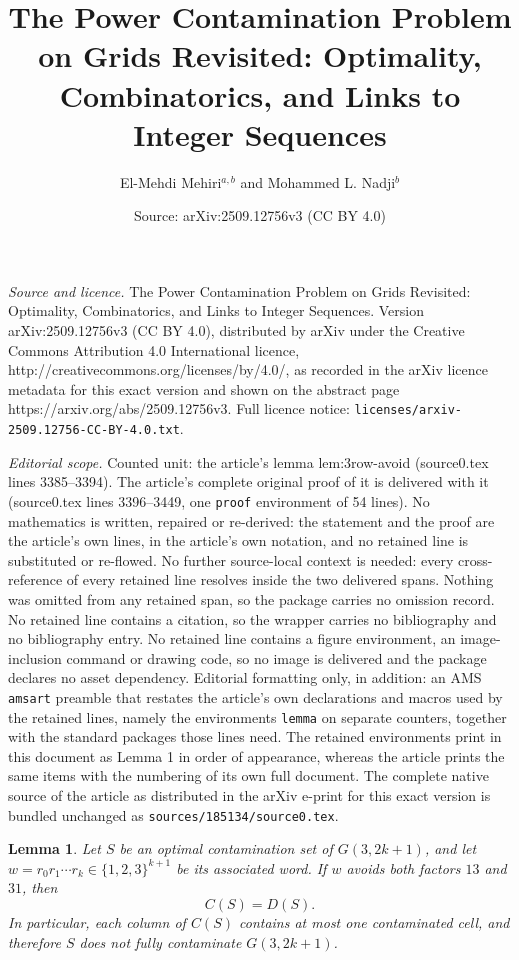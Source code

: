\documentclass[10pt,a4paper]{amsart}
\title{The Power Contamination Problem on Grids Revisited: Optimality, Combinatorics, and Links to Integer Sequences}
\author{El-Mehdi Mehiri$^{a,b}$ and Mohammed L. Nadji$^{b}$}
\date{Source: arXiv:2509.12756v3 (CC BY 4.0)}
\newtheorem{lemma}{Lemma}
\begin{document}
\maketitle

\noindent\emph{Source and licence.} The Power Contamination Problem on Grids Revisited: Optimality, Combinatorics, and Links to Integer Sequences. Version arXiv:2509.12756v3 (CC BY 4.0), distributed by arXiv under the Creative Commons Attribution 4.0 International licence, http://creativecommons.org/licenses/by/4.0/, as recorded in the arXiv licence metadata for this exact version and shown on the abstract page https://arxiv.org/abs/2509.12756v3. Full licence notice: \texttt{licenses/arxiv-2509.12756-CC-BY-4.0.txt}.\par\smallskip

\noindent\textit{Editorial scope.} Counted unit: the article's lemma lem:3row-avoid (source0.tex lines 3385--3394). The article's complete original proof of it is delivered with it (source0.tex lines 3396--3449, one \texttt{proof} environment of 54 lines). No mathematics is written, repaired or re-derived: the statement and the proof are the article's own lines, in the article's own notation, and no retained line is substituted or re-flowed.  No further source-local context is needed: every cross-reference of every retained line resolves inside the two delivered spans.  Nothing was omitted from any retained span, so the package carries no omission record.  No retained line contains a citation, so the wrapper carries no bibliography and no bibliography entry.  No retained line contains a figure environment, an image-inclusion command or drawing code, so no image is delivered and the package declares no asset dependency.  Editorial formatting only, in addition: an AMS \texttt{amsart} preamble that restates the article's own declarations and macros used by the retained lines, namely the environments \texttt{lemma} on separate counters, together with the standard packages those lines need.  The retained environments print in this document as Lemma 1 in order of appearance, whereas the article prints the same items with the numbering of its own full document.  The complete native source of the article as distributed in the arXiv e-print for this exact version is bundled unchanged as \texttt{sources/185134/source0.tex}.
\begin{lemma}\label{lem:3row-avoid}
Let \(S\) be an optimal contamination set of \(G(3,2k+1)\), and let
\(w=r_0r_1\cdots r_k\in\{1,2,3\}^{k+1}\) be its associated word. If \(w\)
avoids both factors \(13\) and \(31\), then
\[
C(S)=D(S).
\]
In particular, each column of \(C(S)\) contains at most one contaminated cell,
and therefore \(S\) does not fully contaminate \(G(3,2k+1)\).
\end{lemma}
\end{document}
